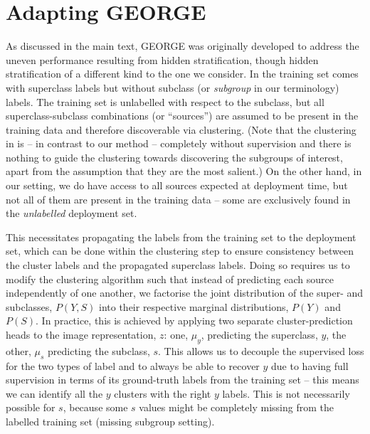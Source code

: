 \section{Adapting GEORGE}\label{adapting_g}
%
As discussed in the main text, GEORGE \citep{SohDunAngGuetal20} was originally developed to address
the uneven performance resulting from hidden stratification, though hidden stratification of a
different kind to the one we consider. 
%
In \citet{SohDunAngGuetal20} the training set comes with superclass labels but without subclass (or
\emph{subgroup} in our terminology) labels. 
%
The training set is unlabelled with respect to the subclass, but all superclass-subclass
combinations (or ``sources'') are assumed to be present in the training data and therefore
discoverable via clustering. 
%
(Note that the clustering in \citet{SohDunAngGuetal20} is -- in contrast to our method -- completely
without supervision and there is nothing to guide the clustering towards discovering the subgroups
of interest, apart from the assumption that they are the most salient.) 
%
On the other hand, in our setting, we do have access to all sources expected at deployment time,
but not all of them are present in the training data -- some are exclusively found in the
\emph{unlabelled} deployment set.
%

This necessitates propagating the labels from the training set to the deployment set, which can be
done within the clustering step to ensure consistency between the cluster labels and the propagated
superclass labels. 
%
Doing so requires us to modify the clustering algorithm such that instead of predicting each source
independently of one another, we factorise the joint distribution of the super- and subclasses,
$P(Y, S)$ into their respective marginal distributions, $P(Y)$ and $P(S)$.
%
In practice, this is achieved by applying two separate cluster-prediction heads to the image
representation, $z$: one, $\mu_y$, predicting the superclass, $y$, the other, $\mu_s$ predicting
the subclass, $s$. 
%
This allows us to decouple the supervised loss for the two types of label and to always be able to
recover $y$ due to having full supervision in terms of its ground-truth labels from the training
set -- this means we can identify all the $y$ clusters with the right $y$ labels.
%
This is not necessarily possible for $s$, because some $s$ values might be completely missing from
the labelled training set (missing subgroup setting).

